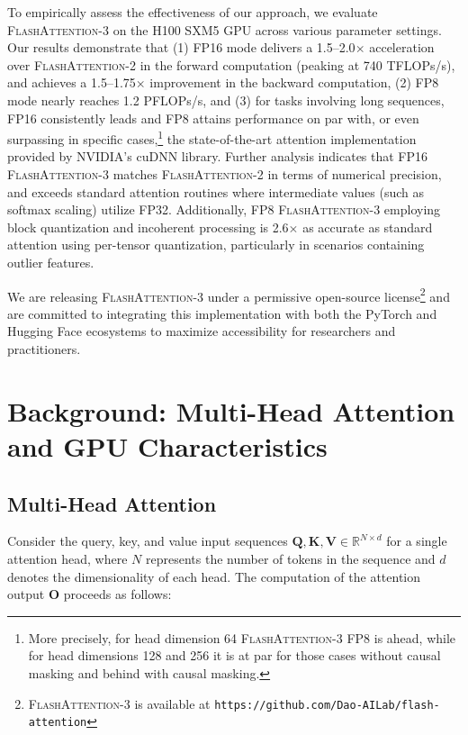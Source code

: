 To empirically assess the effectiveness of our approach, we evaluate \textsc{FlashAttention-3} on the H100 SXM5 GPU across various parameter settings. Our results demonstrate that (1) FP16 mode delivers a 1.5–2.0$\times$ acceleration over \textsc{FlashAttention-2} in the forward computation (peaking at 740 TFLOPs/s), and achieves a 1.5–1.75$\times$ improvement in the backward computation, (2) FP8 mode nearly reaches 1.2 PFLOPs/s, and (3) for tasks involving long sequences, FP16 consistently leads and FP8 attains performance on par with, or even surpassing in specific cases,\footnote{More precisely, for head dimension 64 \textsc{FlashAttention-3} FP8 is ahead, while for head dimensions 128 and 256 it is at par for those cases without causal masking and behind with causal masking.} the state-of-the-art attention implementation provided by NVIDIA’s cuDNN library. Further analysis indicates that FP16 \textsc{FlashAttention-3} matches \textsc{FlashAttention-2} in terms of numerical precision, and exceeds standard attention routines where intermediate values (such as softmax scaling) utilize FP32. Additionally, FP8 \textsc{FlashAttention-3} employing block quantization and incoherent processing is 2.6$\times$ as accurate as standard attention using per-tensor quantization, particularly in scenarios containing outlier features.

We are releasing \textsc{FlashAttention-3} under a permissive open-source license\footnote{\textsc{FlashAttention-3}
  is available at \texttt{https://github.com/Dao-AILab/flash-attention}} and are committed to integrating this implementation with both the PyTorch and Hugging Face ecosystems to maximize accessibility for researchers and practitioners.

\section{Background: Multi-Head Attention and GPU Characteristics}
\label{sec:background}

\subsection{Multi-Head Attention}
\label{subsec:multi_head_attn}

Consider the query, key, and value input sequences $\mathbf{Q}, \mathbf{K}, \mathbf{V} \in \mathbb{R}^{N \times d}$ for a single attention head, where $N$ represents the number of tokens in the sequence and $d$ denotes the dimensionality of each head. The computation of the attention output $\mathbf{O}$ proceeds as follows:

